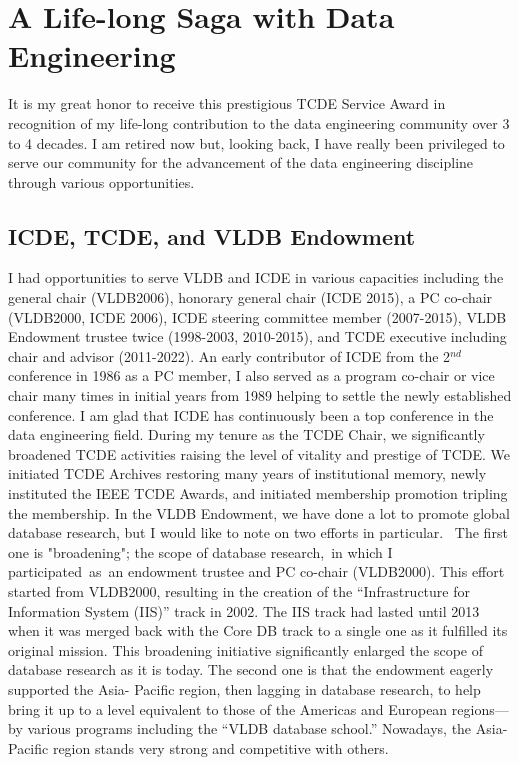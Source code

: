 \documentclass[11pt]{article}
\begin{document}
\section*{A Life-long Saga with Data Engineering}

It is my great honor to receive this prestigious TCDE Service Award in recognition of my life-long
contribution to the data engineering community over 3 to 4 decades. I am retired now but, looking
back, I have really been privileged to serve our community for the advancement of the data
engineering discipline through various opportunities.
\subsection*{ICDE, TCDE, and VLDB Endowment}
I had opportunities to serve VLDB and ICDE in various capacities including the general chair
(VLDB2006), honorary general chair (ICDE 2015), a PC co-chair (VLDB2000, ICDE 2006), ICDE
steering committee member (2007-2015), VLDB Endowment trustee twice (1998-2003, 2010-2015),
and TCDE executive including chair and advisor (2011-2022).
An early contributor of ICDE from the 2$^{nd}$ conference in 1986 as a PC member, I also served as a
program co-chair or vice chair many times in initial years from 1989 helping to settle the newly
established conference. I am glad that ICDE has continuously been a top conference in the data
engineering field.
During my tenure as the TCDE Chair, we significantly broadened TCDE activities raising the level of
vitality and prestige of TCDE. We initiated TCDE Archives restoring many years of institutional
memory, newly instituted the IEEE TCDE Awards, and initiated membership promotion tripling the
membership.
In the VLDB Endowment, we have done a lot to promote global database research, but I would like to
note on two efforts in particular.  The first one is 
"broadening"; the scope of database research, in
which I participated as an endowment trustee and PC co-chair (VLDB2000). This effort started from
VLDB2000, resulting in the creation of the “Infrastructure for Information System (IIS)” track in 2002.
The IIS track had lasted until 2013 when it was merged back with the Core DB track to a single one
as it fulfilled its original mission. This broadening initiative significantly enlarged the scope of
database research as it is today. The second one is that the endowment eagerly supported the Asia-
Pacific region, then lagging in database research, to help bring it up to a level equivalent to those of
the Americas and European regions—by various programs including the “VLDB database school.”
Nowadays, the Asia-Pacific region stands very strong and competitive with others.
\end{document}
